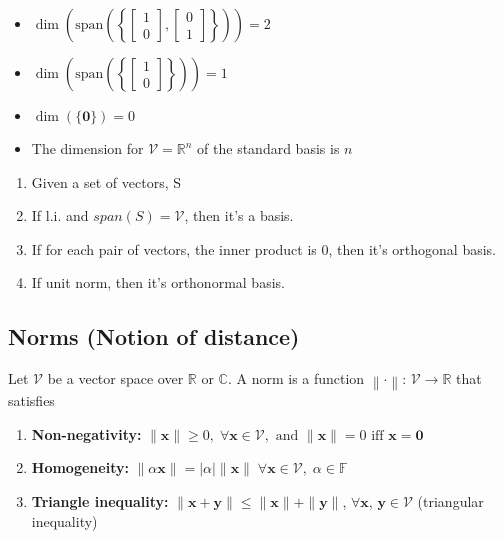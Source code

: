 \begin{example}
    \begin{itemize}
        \item \( \dim \left( \text{span} \left( \left\{ \begin{bmatrix} 1 \\ 0 \end{bmatrix}, \begin{bmatrix} 0 \\ 1 \end{bmatrix} \right\} \right) \right) = 2 \)
        
        \item \( \dim \left( \text{span} \left( \left\{ \begin{bmatrix} 1 \\ 0 \end{bmatrix} \right\} \right) \right) = 1 \)
        
        \item \( \dim \left( \{ \mathbf{0} \} \right) = 0 \)
        \item The dimension for $\mathcal{V}=\mathbb{R}^n$ of the standard basis is $n$
    \end{itemize}
\end{example}

\begin{process}
    \begin{enumerate}
        \item Given a set of vectors, S
        \item If l.i. and $span(S)=\mathcal{V}$, then it's a basis.
        \item If for each pair of vectors, the inner product is 0, then it's orthogonal basis. 
        \item If unit norm, then it's orthonormal basis. 
    \end{enumerate}
\end{process}

\subsection{Norms (Notion of distance)}
\begin{definition}
    Let $\mathcal{V}$ be a vector space over $\mathbb{R}$ or $\mathbb{C}$. A norm is a function $\left\lVert \cdot \right\rVert$: $\mathcal{V} \rightarrow \mathbb{R}$ that satisfies 
    \begin{enumerate}
        \item \textbf{Non-negativity:} \( \| \mathbf{x} \| \geq 0, \; \forall \mathbf{x} \in \mathcal{V}, \text{ and } \| \mathbf{x} \| = 0 \text{ iff } \mathbf{x} = \mathbf{0} \)
        \item \textbf{Homogeneity:} \( \| \alpha \mathbf{x} \| = |\alpha| \| \mathbf{x} \| \; \forall \mathbf{x} \in \mathcal{V}, \; \alpha \in \mathbb{F} \)
        \item \textbf{Triangle inequality:} \( \| \mathbf{x} + \mathbf{y} \| \leq \| \mathbf{x} \| + \| \mathbf{y} \| \), $\forall \mathbf{x}$, $\mathbf{y}\in \mathcal{V}$ (triangular inequality)
    \end{enumerate}
\end{definition}

